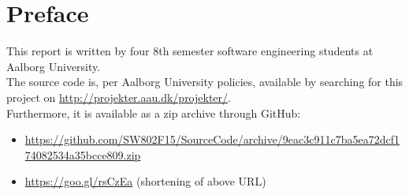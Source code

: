 \chapter{Preface}
This report is written by four 8th semester software engineering students at Aalborg University.\\

\noindent The source code is, per Aalborg University policies, available by searching for this project on \url{http://projekter.aau.dk/projekter/}.\\

\noindent Furthermore, it is available as a zip archive through GitHub:

\begin{itemize}
\item \parbox{.8\textwidth}{\url{https://github.com/SW802F15/SourceCode/archive/9eac3c911c7ba5ea72dcf174082534a35bcce809.zip}}
\item \url{https://goo.gl/rsCzEa} (shortening of above URL)
\end{itemize}
















\vspace{5cm}
\noindent 